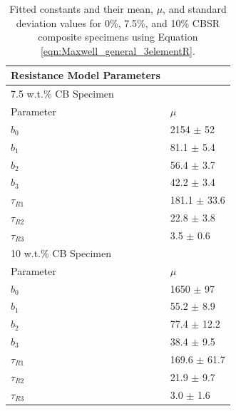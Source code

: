 \begin{table}[H]
	\caption{Fitted constants and their mean, $\mu$, and standard deviation values for 0\%, 7.5\%, and 10\% CBSR composite specimens using Equation \ref{eqn:Maxwell_general_3elementR}.}
	\begin{center}
		\label{tab:generalised_model_constants}
		\begin{tabular}{l l}
			\textbf{Resistance Model Parameters} \\
			\hline
			7.5 w.t.\% CB Specimen \\
			\hline
			Parameter & $\mu$\\
			\hline
			$b_0$ & 2154 $\pm$ 52\\
			$b_1$ & 81.1 $\pm$ 5.4\\
			$b_2$ & 56.4 $\pm$ 3.7\\
			$b_3$ & 42.2 $\pm$ 3.4\\
			$\tau_{R1}$ & 181.1 $\pm$ 33.6 \\
			$\tau_{R2}$ & 22.8 $\pm$ 3.8 \\
			$\tau_{R3}$ & 3.5 $\pm$ 0.6 \\
			\hline
			10 w.t.\% CB Specimen \\
			\hline
			Parameter & $\mu$ \\
			\hline
			$b_0$ & 1650 $\pm$ 97\\
			$b_1$ & 55.2 $\pm$ 8.9 \\
			$b_2$ & 77.4 $\pm$ 12.2 \\
			$b_3$ & 38.4 $\pm$ 9.5 \\
			$\tau_{R1}$ & 169.6 $\pm$ 61.7 \\
			$\tau_{R2}$ & 21.9 $\pm$ 9.7 \\
			$\tau_{R3}$ & 3.0 $\pm$ 1.6 \\
			\hline
		\end{tabular}
	\end{center}
\end{table}


